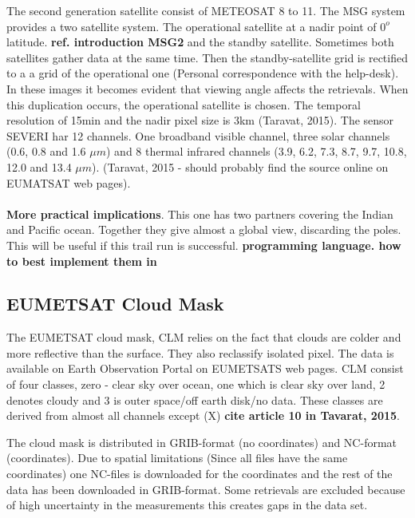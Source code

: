 The second generation satellite consist of METEOSAT 8 to 11. The MSG system provides a two satellite system. The operational satellite at a nadir point of $0^o$ latitude. \textbf{ref. introduction MSG2} and the standby satellite. Sometimes both satellites gather data at the same time. Then the standby-satellite grid is rectified to a a grid of the operational one (Personal correspondence with the help-desk). In these images it becomes evident that viewing angle affects the retrievals. When this duplication occurs, the operational satellite is chosen. The temporal resolution of 15min and the nadir pixel size is 3km (Taravat, 2015). The sensor SEVERI har 12 channels. One broadband visible channel, three solar channels (0.6, 0.8 and 1.6 $\mu m$) and 8 thermal infrared channels (3.9, 6.2, 7.3, 8.7, 9.7, 10.8, 12.0 and 13.4 $\mu m$). (Taravat, 2015 - should probably find the source online on EUMATSAT web pages).
\\ \\ 
\textbf{More practical implications}. This one has two partners covering the Indian and Pacific ocean. Together they give almost a global view, discarding the poles. This will be useful if this trail run is successful.  \textbf{programming language. how to best implement them in }

\subsection{EUMETSAT Cloud Mask} \label{sec:cloud_mask}
The EUMETSAT cloud mask, CLM relies on the fact that clouds are colder and more reflective than the surface. They also reclassify isolated pixel. The data is available on Earth Observation Portal on EUMETSATS web pages. CLM consist of four classes, zero - clear sky over ocean, one which is clear sky over land, 2 denotes cloudy and 3 is outer space/off earth disk/no data. These classes are derived from almost all channels except (X) \textbf{cite article 10 in Tavarat, 2015}.

The cloud mask is distributed in GRIB-format (no coordinates) and NC-format (coordinates). Due to spatial limitations (Since all files have the same coordinates) one NC-files is downloaded for the coordinates and the rest of the data has been downloaded in GRIB-format. Some retrievals are excluded because of high uncertainty in the measurements this creates gaps in the data set. 

